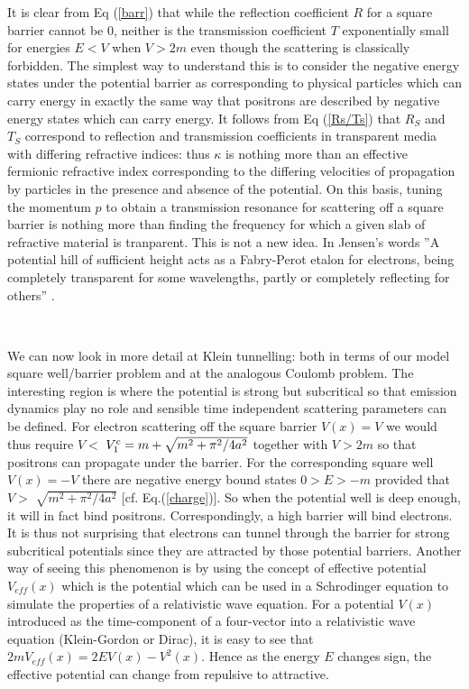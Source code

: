 \noindent It is clear from Eq (\ref{barr}) that while the reflection
coefficient $R$ for a square barrier cannot be $0$, neither is the
transmission coefficient $T$ exponentially small for energies $E<V$ when $%
V>2m$ even though the scattering is classically forbidden. The simplest way
to understand this is to consider the negative energy states under the
potential barrier as corresponding to physical particles which can carry
energy in exactly the same way that positrons are described by negative
energy states which can carry energy. It follows from Eq (\ref{Rs/Ts}) that $%
R_S$ and $T_S$ correspond to reflection and transmission coefficients in
transparent media with differing refractive indices: thus $\kappa $ is
nothing more than an effective fermionic refractive index corresponding to
the differing velocities of propagation by particles in the presence and
absence of the potential. On this basis, tuning the momentum $p$ to obtain a
transmission resonance for scattering off a square barrier is nothing more
than finding the frequency for which a given slab of refractive material is
tranparent. This is not a new idea. In Jensen's words ''A potential hill of
sufficient height acts as a Fabry-Perot etalon for electrons, being
completely transparent for some wavelengths, partly or completely reflecting
for others'' \cite{bak}.

\smallskip\ 

\noindent We can now look in more detail at Klein tunnelling: both in terms
of our model square well/barrier problem and at the analogous Coulomb
problem. The interesting region is where the potential is strong but
subcritical so that emission dynamics play no role and sensible time
independent scattering parameters can be defined. For electron scattering
off the square barrier $V(x)=V$ we would thus require $V<$ $V_1^c=m+\sqrt{%
m^2+\pi ^2/4a^2}$ together with $V>2m$ so that positrons can propagate under
the barrier. For the corresponding square well $V(x)=-V$ there are negative
energy bound states $0>E>-m$ provided that $V>$ $\sqrt{m^2+\pi ^2/4a^2}$
[cf. Eq.(\ref{charge})]. So when the potential well is deep enough, it will
in fact bind positrons. Correspondingly, a high barrier will bind electrons.
It is thus not surprising that electrons can tunnel through the barrier for
strong subcritical potentials since they are attracted by those potential
barriers. Another way of seeing this phenomenon is by using the concept of
effective potential $V_{eff}(x)$ which is the potential which can be used in
a Schrodinger equation to simulate the properties of a relativistic wave
equation. For a potential $V(x)$ introduced as the time-component of a
four-vector into a relativistic wave equation (Klein-Gordon or Dirac), it is
easy to see that $2mV_{eff}(x)=2EV(x)-V^2(x).$ Hence as the energy $E$
changes sign, the effective potential can change from repulsive to
attractive.

